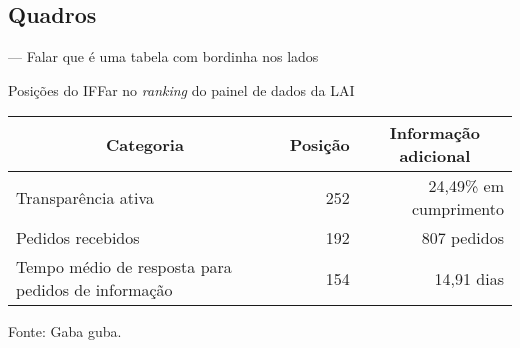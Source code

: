 \subsection{Quadros}
--- Falar que é uma tabela com bordinha nos lados
\begin{quadro}[H]
  \Centering\singlespacing

  \caption{Posições do IFFar no \textit{ranking} do painel de dados da LAI}
  \label{quadro:cgu-iffar}
  \begin{tabularx}{12cm}
    {|X|r|r|} %
    \hline
    \multicolumn{1}{|c|}{\textbf{Categoria}}    &   
    \multicolumn{1}{c}{\textbf{Posição}}  & 
    \multicolumn{1}{|c|}{\textbf{Informação adicional}} \\
    \hline

    Transparência ativa &
    252\textordmasculine{} &
    24,49\% em cumprimento \\

    Pedidos recebidos &
    192\textordmasculine{} &
    807 pedidos \\

    Tempo médio de resposta para pedidos de informação       &   
    154\textordmasculine{} &
    14,91 dias \\
    \hline

  \end{tabularx}

\hspace{\fill}

\footnotesize

Fonte: Gaba guba.
\end{quadro}

